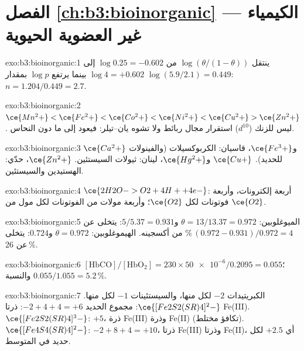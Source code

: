 \section*{الفصل \ref{ch:b3:bioinorganic} --- الكيمياء غير العضوية الحيوية}

\begin{solution}{exo:b3:bioinorganic:1}
ينتقل $\log(\theta/(1 - \theta))$ من $\log 0.25 = -0.602$ إلى $\log 4 = +0.602$ بينما يرتفع $\log p$ بمقدار
$\log(5.9/2.1) = 0.449$: $n = 1.204/0.449 = 2.7$.
\end{solution}

\begin{solution}{exo:b3:bioinorganic:2}
$\ce{Mn^2+} < \ce{Fe^2+} < \ce{Co^2+} < \ce{Ni^2+} < \ce{Cu^2+} > \ce{Zn^2+}$. ليس للزنك ($d^{10}$) استقرار مجال ربائط ولا
تشوه يان--تيلر: فيعود إلى ما دون النحاس.
\end{solution}

\begin{solution}{exo:b3:bioinorganic:3}
$\ce{Ca^2+}$ و$\ce{Fe^3+}$، قاسيان: الكربوكسيلات (والفينولات للحديد). $\ce{Cu+}$ و$\ce{Hg^2+}$، لينان:
ثيولات السيستئين. $\ce{Zn^2+}$، حدّي: الهستيدين والسيستئين.
\end{solution}

\begin{solution}{exo:b3:bioinorganic:4}
$\ce{2H2O -> O2 + 4H+ + 4e-}$: أربعة إلكترونات، وأربعة فوتونات لكل $\ce{O2}$؛ وأربعة مولات من الفوتونات لكل
مول من $\ce{O2}$.
\end{solution}

\begin{solution}{exo:b3:bioinorganic:5}
الميوغلوبين: $\theta = 13/13.37 = 0.972$ و$5/5.37 = 0.931$: يتخلى عن $(0.972 - 0.931)/0.972 = 4$\,\% من
أكسجينه. الهيموغلوبين: $\theta = 0.972$ و$0.724$: يتخلى عن 26\,\%.
\end{solution}

\begin{solution}{exo:b3:bioinorganic:6}
$[\mathrm{HbCO}]/[\mathrm{HbO_2}] = 230 \times \num{50e-6}/0.2095 = 0.055$؛ والنسبة $0.055/1.055 = 5.2$\,\%.
\end{solution}

\begin{solution}{exo:b3:bioinorganic:7}
الكبريتيدات $-2$ لكل منها، والسيستئينات $-1$ لكل منها. $\ce{[Fe2S2(SR)4]^2-}$: مجموع الحديد $-2 + 4 + 4 = +6$: ذرتا
Fe(III). $\ce{[Fe2S2(SR)4]^3-}$: $+5$، ذرة Fe(III) وذرة Fe(II) (تكافؤ مختلط). $\ce{[Fe4S4(SR)4]^2-}$:
$-2 + 8 + 4 = +10$، ذرتا Fe(III) وذرتا Fe(II)، أي $+2.5$ لكل حديد في المتوسط.
\end{solution}

